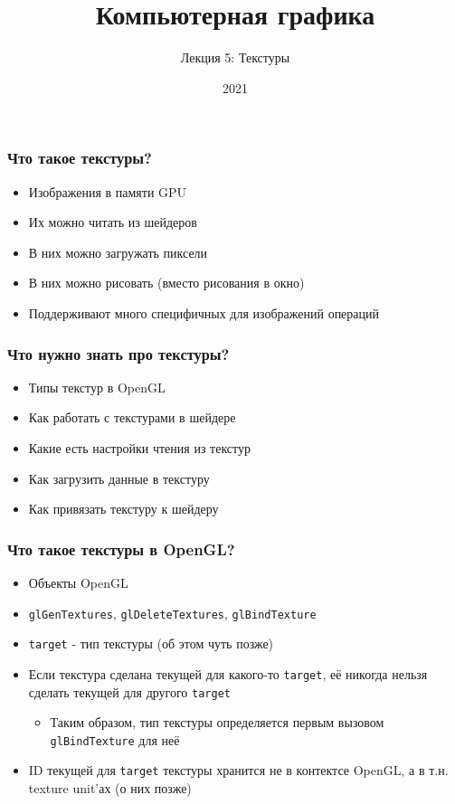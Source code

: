 \documentclass{beamer}
\title{Компьютерная графика}
\subtitle{Лекция 5: Текстуры}
\date{2021}
\begin{document}
\frame{\titlepage}

\begin{frame}[fragile]
\frametitle{Что такое текстуры?}
\begin{itemize}
\item Изображения в памяти GPU
\pause
\item Их можно читать из шейдеров
\pause
\item В них можно загружать пиксели
\pause
\item В них можно рисовать (вместо рисования в окно)
\pause
\item Поддерживают много специфичных для изображений операций
\end{itemize}
\end{frame}

\begin{frame}[fragile]
\frametitle{Что нужно знать про текстуры?}
\begin{itemize}
\item Типы текстур в OpenGL
\pause
\item Как работать с текстурами в шейдере
\pause
\item Какие есть настройки чтения из текстур
\pause
\item Как загрузить данные в текстуру
\pause
\item Как привязать текстуру к шейдеру
\end{itemize}
\end{frame}

\begin{frame}[fragile]
\frametitle{Что такое текстуры в OpenGL?}
\begin{itemize}
\item Объекты OpenGL
\pause
\item \verb|glGenTextures|, \verb|glDeleteTextures|, \verb|glBindTexture|
\pause
\item \verb|target| - тип текстуры (об этом чуть позже)
\pause
\item Если текстура сделана текущей для какого-то \verb|target|, её никогда нельзя сделать текущей для другого \verb|target|
\begin{itemize}
\item Таким образом, тип текстуры определяется первым вызовом \verb|glBindTexture| для неё
\end{itemize}
\pause
\item ID текущей для \verb|target| текстуры хранится не в контектсе OpenGL, а в т.н. texture unit'ах (о них позже)
\end{itemize}
\end{frame}
\end{document}
